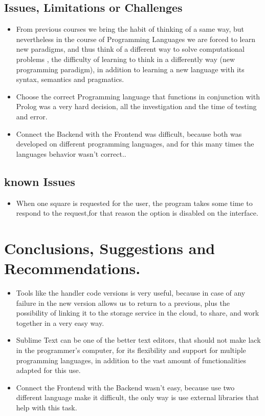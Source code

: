 \documentclass[12pt]{article}
\begin{document}
\subsection{Issues, Limitations or Challenges}
\begin{itemize}
\item From previous courses we bring the habit of thinking of a same way, but nevertheless in the course of Programming Languages we are forced to learn new paradigms, and thus think of a different way to solve computational problems , the difficulty of learning to think in a differently way (new programming paradigm), in addition to learning a new language with its syntax, semantics and pragmatics.
\item Choose the correct Programming language that functions in conjunction with Prolog was a very hard decision, all the investigation and the time of testing and error.
\item Connect the Backend with the Frontend was difficult, because both was developed on different programming languages, and for this many times the languages behavior wasn't correct..
\end{itemize}
\subsection{known Issues}
\begin{itemize}
\item When one square is requested for the user, the program takes some time to respond to the request,for that reason the option is disabled on the interface.
\end{itemize}

\section{Conclusions, Suggestions and Recommendations.}
\begin{itemize}
\item Tools like the handler code versions is very useful, because in case of any failure in the new version allows us to return to a previous, plus the possibility of linking it to the storage service in the cloud, to share, and work together in a very easy way.
\item Sublime Text can be one of the better text editors, that should not make lack in the programmer's computer, for its flexibility and support for multiple programming languages, in addition to the vast amount of functionalities adapted for this use.
\item Connect the Frontend with the Backend wasn't easy, because use two different language make it difficult, the only way is use external libraries that help with this task. 
\end{itemize}
\end{document}
